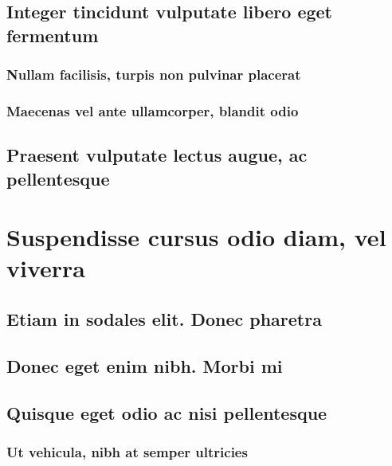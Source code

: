 \documentclass[%
  german,%
  exercise,%
  oneside,%
]{iswartcl}
\begin{document}
\lipsum[1-8]

\subsection{Integer tincidunt vulputate libero eget fermentum}

\lipsum[1-8]

\subsubsection{Nullam facilisis, turpis non pulvinar placerat}

\lipsum[1-8]

\subsubsection{Maecenas vel ante ullamcorper, blandit odio}

\lipsum[1-8]

\subsection{Praesent vulputate lectus augue, ac pellentesque}

\lipsum[1-8]

\section{Suspendisse cursus odio diam, vel viverra}

\lipsum[1-8]

\subsection{Etiam in sodales elit. Donec pharetra}

\lipsum[1-8]

\subsection{Donec eget enim nibh. Morbi mi}

\lipsum[1-8]

\subsection{Quisque eget odio ac nisi pellentesque}

\lipsum[1-8]

\subsubsection{Ut vehicula, nibh at semper ultricies}
\end{document}
